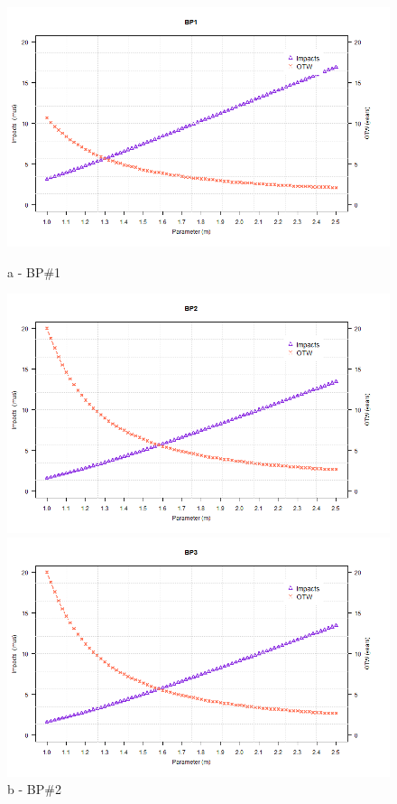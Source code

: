 \begin{figure}[!htb]
	\begin{minipage}[b]{0.5\linewidth}
		\centering
		\includegraphics[width=\textwidth]{figures/ch05_fig_sam_pump1}
		\caption*{a - BP\#1}
	\end{minipage}
	\hspace{0.05cm}
	\begin{minipage}[b]{0.5\linewidth}
		\centering
		\includegraphics[width=\textwidth]{figures/ch05_fig_sam_pump2}
		\caption*{b - BP\#2}
	\end{minipage}
	\hspace{0.05cm}
	\begin{minipage}[b]{0.5\linewidth}
		\centering
		\includegraphics[width=\textwidth]{figures/ch05_fig_sam_pump3}

\end{minipage}
\end{figure}

